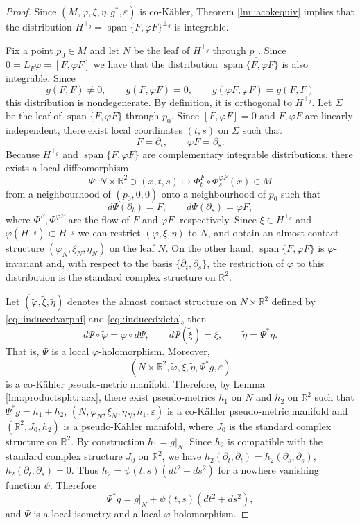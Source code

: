 \documentclass[12pt,a4paper,final]{amsart}
\numberwithin{equation}{section}
\theoremstyle{df}
\newcommand{\R}{\mathbb{R}}
\newcommand{\Span}{\operatorname{span}}
\newcommand{\eps}{\varepsilon}
\begin{document}
\begin{proof}
Since $(M,\varphi,\xi,\eta,g^\ast,\eps)$ is co-K\"ahler, Theorem \ref{lm::acokequiv} implies that the distribution $H^{\perp_g}=\Span\{F,\varphi F\}^{\perp_g}$
is integrable.
\par Fix a point $p_0\in M$ and let $N$ be the leaf of
$H^{\perp_g}$ through $p_0$.
Since $0=L_F\varphi=[F,\varphi F]$
we have that the distribution $\Span\{F,\varphi F\}$ is also integrable.
Since
$$
g(F,F)\neq 0,\qquad g(F,\varphi F)=0,\qquad g(\varphi F,\varphi F)=g(F,F)
$$
this distribution is nondegenerate. By definition, it is orthogonal to
$H^{\perp_g}$.
Let $\Sigma$ be the leaf of $\Span\{F,\varphi F\}$ through $p_0$. Since $[F,\varphi F]=0$
and $F,\varphi F$ are linearly independent, there exist local coordinates
$(t,s)$ on $\Sigma$ such that
$$
F=\partial_t,\qquad \varphi F=\partial_s.
$$
Because $H^{\perp_g}$ and $\Span\{F,\varphi F\}$ are complementary integrable
distributions, there exists a local diffeomorphism
$$
\Psi:N\times \R^2\ni (x,t,s)\mapsto \Phi_t^{F}\circ \Phi_s^{\varphi F}(x)\in M
$$
from a neighbourhood of $(p_0,0,0)$ onto a neighbourhood of $p_0$ such that
$$
d\Psi(\partial_t)=F,\qquad d\Psi(\partial_s)=\varphi F,
$$
where $\Phi^{F},\Phi^{\varphi F}$ are the flow of $F$ and $\varphi F$, respectively.
Since $\xi\in H^{\perp_g}$ and $\varphi(H^{\perp_g})\subset H^{\perp_g}$ we can restrict $(\varphi,\xi,\eta)$ to $N$, and obtain an almost contact structure
$(\varphi_N,\xi_N,\eta_N)$ on the leaf $N$.
 On the other hand,
$\Span\{F,\varphi F\}$ is $\varphi$-invariant and, with respect to the basis
$\{\partial_t,\partial_s\}$, the restriction of $\varphi$ to this distribution
is the standard complex structure on $\R^2$.

Let $(\widetilde\varphi,\widetilde\xi,\widetilde\eta)$ denotes the almost
contact structure on $N\times\R^2$ defined by \eqref{eq::inducedvarphi} and \eqref{eq::inducedxieta}, then
$$
d\Psi\circ \widetilde\varphi=\varphi\circ d\Psi,
\qquad
d\Psi(\widetilde\xi)=\xi,
\qquad
\widetilde\eta=\Psi^\ast\eta.
$$
That is, $\Psi$ is a local $\varphi$-holomorphism.
Moreover,
$$
(N\times\R^2,\widetilde\varphi,\widetilde\xi,\widetilde\eta,\Psi^\ast g,\eps)
$$
is a co-K\"ahler pseudo-metric manifold. Therefore, by
Lemma \ref{lm::productsplit::acx}, there exist pseudo-metrics $h_1$ on $N$ and
$h_2$ on $\R^2$ such that $\Psi^\ast g=h_1+h_2$, $(N,\varphi_N,\xi_N,\eta_N,h_1,\eps)$ is a co-K\"ahler pseudo-metric manifold
and $(\R^2,J_0,h_2)$ is a pseudo-K\"ahler manifold, where $J_0$ is the standard
complex structure on $\R^2$.
By construction $h_1=g|_N$. Since $h_2$ is compatible with the standard
complex structure $J_0$ on $\R^2$, we have $h_2(\partial_t,\partial_t)=h_2(\partial_s,\partial_s)$, $h_2(\partial_t,\partial_s)=0$.
Thus $h_2=\psi(t,s)(dt^2+ds^2)$ for a nowhere vanishing function $\psi$.
Therefore
$$
\Psi^\ast g=g|_N+\psi(t,s)(dt^2+ds^2),
$$
and $\Psi$ is a local isometry and a local $\varphi$-holomorphism.
\end{proof}
\end{document}
